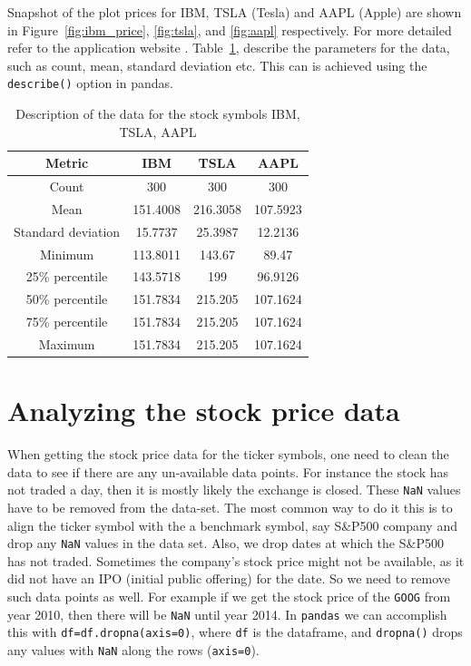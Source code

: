 \documentclass[12pt]{article}
\begin{document}
\begin{itemize}
Snapshot of the plot prices for IBM, TSLA (Tesla) and AAPL (Apple) are shown in Figure~\ref{fig:ibm_price}, \ref{fig:tsla}, and \ref{fig:aapl} respectively. For more detailed refer to the application website \href{http://quantfy.herokuapp.com}{\color{blue}{\bf QuantFy}} \cite{qfy}. Table~\ref{tab:params}, describe the parameters for the data, such as count, mean, standard deviation etc. This can is achieved using the \texttt{describe()} option in pandas.

\begin{table}
\begin{center}
\begin{tabular} {|c|c|c|c|}
\hline \hline
\textbf{Metric} & \textbf{IBM} & \textbf{TSLA} & \textbf{AAPL} \\ \hline
Count & 300 & 300 & 300 \\ \hline
Mean & 151.4008 & 216.3058 & 107.5923\\ \hline
Standard deviation   & 15.7737 & 25.3987&12.2136  \\ \hline
Minimum & 113.8011 & 143.67 & 89.47 \\ \hline
25\% percentile & 143.5718 & 199 & 96.9126 \\ \hline
50\% percentile  & 151.7834 & 215.205 & 107.1624\\ \hline
75\% percentile  & 151.7834 & 215.205 & 107.1624 \\ \hline
Maximum  &  151.7834 & 215.205 & 107.1624\\ \hline
\hline
\end{tabular}
\end{center}
\caption{Description of the data for the stock symbols IBM, TSLA, AAPL}
\label{tab:params}
\end{table}

\section{Analyzing the stock price data}
\label{sec:anal}

When getting the stock price data for the ticker symbols, one need to clean the data to see if there are any un-available data points. For instance the stock has not traded a day, then it is mostly likely the exchange is closed. These \texttt{NaN} values have to be removed from the data-set. The most common way to do it this is to align the ticker symbol with the a benchmark symbol, say S\&P500 company and drop any \texttt{NaN} values in the data set. Also, we drop dates at which the S\&P500 has not traded. Sometimes the company's stock price might not be available, as it did not have an IPO (initial public offering) for the date. So we need to remove such data points as well. For example if we get the stock price of the \texttt{GOOG} from year 2010, then there will be \texttt{NaN} until year 2014. In \texttt{pandas} we can accomplish this with \texttt{df=df.dropna(axis=0)}, where \texttt{df} is the dataframe, and \texttt{dropna()} drops any values with \texttt{NaN} along the rows (\texttt{axis=0}).







\end{itemize}
\end{document}
